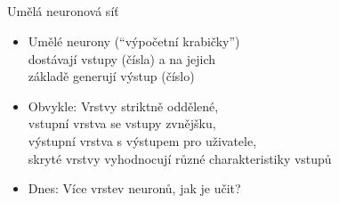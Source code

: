 \documentclass{beamer}
\begin{document}
\subsection{}
\begin{frame}{Umělá neuronová síť}
\begin{itemize}
\item Umělé neurony (``výpočetní krabičky'') \\ dostávají vstupy (čísla) a na jejich \\ základě generují výstup (číslo)
\item Obvykle: Vrstvy striktně oddělené, \\ vstupní vrstva se vstupy zvnějšku, \\ výstupní vrstva s výstupem pro uživatele, \\ skryté vrstvy vyhodnocují různé charakteristiky vstupů
\item Dnes: Více vrstev neuronů, jak je učit?
\end{itemize}
\end{frame}
\end{document}
